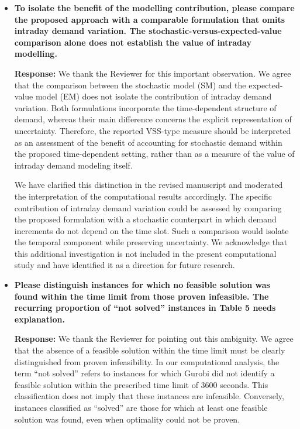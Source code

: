 \documentclass[11pt]{article}
\begin{document}
\begin{enumerate}
\begin{itemize}
\item \textbf{To isolate the benefit of the modelling contribution, please compare the proposed approach with a comparable formulation that omits intraday demand variation. The stochastic-versus-expected-value comparison alone does not establish the value of
intraday modelling.}


\noindent\textbf{Response:} We thank the Reviewer for this important observation. We agree that the comparison between the stochastic model (SM) and the expected-value model (EM) does not isolate the contribution of intraday demand variation. Both formulations incorporate the time-dependent structure of demand, whereas their main difference concerns the explicit representation of uncertainty. Therefore, the reported VSS-type measure should be interpreted as an assessment of the benefit of accounting for stochastic demand within the proposed time-dependent setting, rather than as a measure of the value of intraday demand modeling itself.

We have clarified this distinction in the revised manuscript and moderated the interpretation of the computational results accordingly. The specific contribution of intraday demand variation could be assessed by comparing the proposed formulation with a stochastic counterpart in which demand increments do not depend on the time slot. Such a comparison would isolate the temporal component while preserving uncertainty. We acknowledge that this additional investigation is not included in the present computational study and have identified it as a direction for future research.



\item \textbf{Please distinguish instances for which no feasible solution was found within the time
limit from those proven infeasible. The recurring proportion of “not solved” instances in
Table 5 needs explanation.}


\noindent\textbf{Response:} We thank the Reviewer for pointing out this ambiguity. We agree that the absence of a feasible solution within the time limit must be clearly distinguished from proven infeasibility. In our computational analysis, the term ``not solved'' refers to instances for which Gurobi did not identify a feasible solution within the prescribed time limit of 3600 seconds. This classification does not imply that these instances are infeasible. Conversely, instances classified as ``solved'' are those for which at least one feasible solution was found, even when optimality could not be proven.


\end{itemize}
\end{enumerate}
\end{document}
